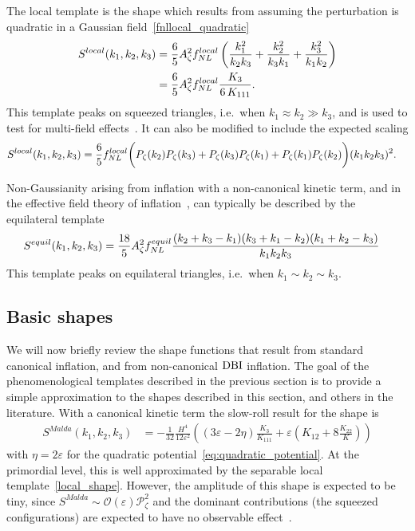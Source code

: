     The local template is the shape which results from assuming the perturbation is
    quadratic in a Gaussian field~\eqref{fnllocal_quadratic}
\begin{align}\label{local_shape}
S^{local}(k_1,k_2,k_3)
    &= \frac{6}{5}A_\zeta^2f^{local}_{NL}\left(\frac{k_1^2}{k_2k_3}+\frac{k_2^2}{k_3k_1}+\frac{k_3^2}{k_1k_2}\right)\\
    &= \frac{6}{5}A_\zeta^2f^{local}_{NL}\frac{K_3}{6\,K_{111}}.
\end{align}
This template peaks on squeezed triangles, i.e.\ when $k_1\approx k_2\gg k_3$,
and is used to test for multi-field effects~\cite{Planck_NG_2015}.
It can also be modified to include the expected scaling
\begin{align}
S^{local}(k_1,k_2,k_3)
    &= \frac{6}{5}f^{local}_{NL}\bigg(
        P_\zeta(k_2)P_\zeta(k_3)
        +P_\zeta(k_3)P_\zeta(k_1)
        +P_\zeta(k_1)P_\zeta(k_2)
    \bigg)(k_1k_2k_3)^2.
\end{align}


    Non-Gaussianity arising from inflation with a non-canonical kinetic term,
    and in the effective field theory of inflation~\cite{Cheung_eft, Baumann_horizon_2011},
    can typically be described by the equilateral template
\begin{align}\label{equil_shape}
    S^{equil}(k_1,k_2,k_3)
    &= \frac{18}{5}A_\zeta^2f^{equil}_{NL}\frac{(k_2+k_3-k_1)(k_3+k_1-k_2)(k_1+k_2-k_3)}{k_1k_2k_3}
\end{align}
This template peaks on equilateral triangles, i.e.\ when $k_1\sim k_2\sim k_3$.


\subsection{Basic shapes}\label{sec:basic_shapes}
    We will now briefly review the shape functions that result from
    standard canonical inflation, and from non-canonical $\text{DBI}$ inflation.
    The goal of the phenomenological templates described in the previous
    section is to provide a simple approximation to the shapes described
    in this section, and others in the literature.
    With a canonical kinetic term
    the slow-roll result for the shape is~\cite{Maldacena}
\begin{align}\label{malda_shape}
    S^{Malda}(k_1,k_2,k_3) &= -\frac{1}{32}\frac{H^4}{12\varepsilon^2} \left( (3\varepsilon-2\eta)\frac{K_3}{K_{111}}+\varepsilon \left(K_{12}+8\frac{K_{22}}{K}\right) \right)
\end{align}
with $\eta=2\varepsilon$ for the quadratic potential~\eqref{eq:quadratic_potential}.
At the primordial level, this is well approximated by the separable local template~\eqref{local_shape}.
However, the amplitude of this shape is expected to be tiny,
since $S^{Malda}\sim\mathcal{O}(\varepsilon)\mathcal{P}^2_{\zeta}$
and the dominant contributions (the squeezed configurations) are expected
to have no observable effect~\cite{Cabass_2016}.


